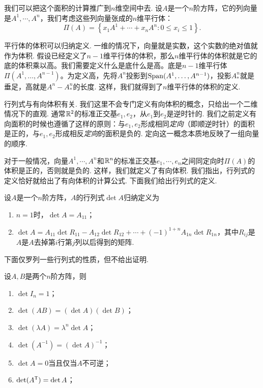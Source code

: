 我们可以把这个面积的计算推广到$n$维空间中去. 设$A$是一个$n$阶方阵，它的列向量是$A^1,\cdots,A^n$，我们考虑这些列向量张成的$n$维平行体：
\[\Pi(A)=\left\{x_1A^1+\cdots+x_nA^n:0\leq x_i\leq 1\right\}.\]

平行体的体积可以归纳定义. 一维的情况下，向量就是实数，这个实数的绝对值就作为体积. 假设已经定义了$n-1$维平行体的体积，那么$n$维平行体的体积就是它的底的体积乘以高。我们需要定义什么是底什么是高。底是$n-1$维平行体$\Pi(A^1,\dots,A^{n-1})$。为定义高，先将$A^n$投影到$\operatorname*{Span}(A^1,\dots,A^{n-1})$，投影$A^n_*$就是垂足，高就是$A^n-A^n_*$的长度. 这样，我们就得到了$n$维平行体的体积的定义. 

行列式与有向体积有关. 我们这里不会专门定义有向体积的概念，只给出一个二维情况下的直观. 通常$\mathbb{R}^2$的标准正交基$e_1,e_2$，从$e_1$到$e_2$是逆时针的. 我们之前定义有向面积的时候也遵循了这样的原则：与$e_1,e_2$形成相同\emph{定向}（即顺逆时针）的面积是正的，与$e_1,e_2$形成相反\emph{定向}的面积是负的. 定向这一概念本质地反映了一组向量的顺序. 

对于一般情况，向量$A^1,\cdots,A^n$和$\mathbb{R}^n$的标准正交基$e_1,\cdots,e_n$之间同定向时$\Pi(A)$的体积是正的，否则就是负的. 这样，我们就定义了有向体积. 我们指出，行列式的定义恰好就给出了有向体积的计算公式. 下面我们给出行列式的定义. 

\begin{definition}[行列式]
    设$A$是一个$n$阶方阵，$A$的行列式$\det A$归纳定义为
\begin{enumerate}
    \item $n=1$时，$\det A=A_{11}$；
    \item $\det A=A_{11}\det R_{11}-A_{12}\det R_{12}+\cdots+(-1)^{1+n}A_{1n}\det R_{1n}$，其中$R_{ij}$是$A$是$A$去掉第$i$行第$j$列以后得到的矩阵. 
\end{enumerate}
\end{definition}

下面仅罗列一些行列式的性质，但不给出证明. 

\begin{proposition}\label{prop:determinant}
    设$A,B$是两个$n$阶方阵，则
    \begin{enumerate}
        \item $\det I_n=1$；
        \item $\det(AB)=(\det A)(\det B)$；
        \item $\det(\lambda A)=\lambda^n\det A$；
        \item $\det(A^{-1})=(\det A)^{-1}$；
        \item $\det A=0$当且仅当$A$不可逆；
        \item $\det(A^{\mathsf{T}})=\det A$；
    \end{enumerate}
\end{proposition}

